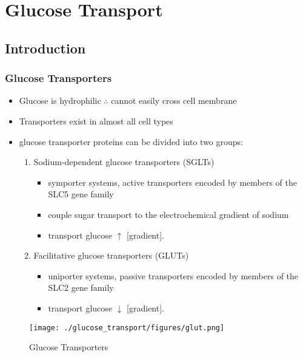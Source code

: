 \documentclass{scrartcl}
\begin{document}
\section{Glucose Transport}
\label{sec:org5985651}
\subsection{Introduction}
\label{sec:orgb583a22}
\subsubsection{Glucose Transporters}
\label{sec:org9a096b7}
\begin{itemize}
\item Glucose is hydrophilic \(\therefore\) cannot easily cross cell membrane
\item Transporters exist in almost all cell types
\item glucose transporter proteins can be divided into two groups:
\begin{enumerate}
\item Sodium-dependent glucose transporters (SGLTs)
\begin{itemize}
\item symporter systems, active transporters encoded by members of
the SLC5 gene family
\item couple sugar transport to the electrochemical gradient of sodium
\item transport glucose \(\uparrow\) [gradient].
\end{itemize}
\item Facilitative glucose transporters (GLUTs)
\begin{itemize}
\item uniporter systems, passive transporters encoded by members of the SLC2 gene family
\item transport glucose \(\downarrow\) [gradient].
\end{itemize}
\end{enumerate}
\end{itemize}

\begin{figure}[htbp]
\centering
\texttt{[image: ./glucose\_transport/figures/glut.png]}
\caption[glucose transporters]{\label{fig:org1db11d2}
Glucose Transporters}
\end{figure}
\end{document}
